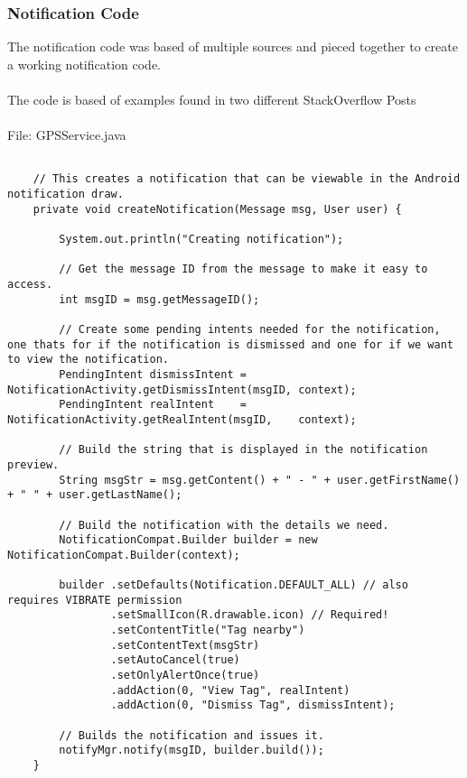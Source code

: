 \subsubsection{Notification Code}

The notification code was based of multiple sources and pieced together to create a working notification code.\\
\\
The code is based of examples found in two different StackOverflow Posts \cite{tofira:DetermineaddActionclickforAndroidnotifications:2013:online} \cite{FleshWound:HowtodismissAndroidnotificationafteractionhasbeenclicked:2012:online}\\
\\
File: GPSService.java
\begin{lstlisting}
 
    // This creates a notification that can be viewable in the Android notification draw.
    private void createNotification(Message msg, User user) {

        System.out.println("Creating notification");

        // Get the message ID from the message to make it easy to access.
        int msgID = msg.getMessageID();

        // Create some pending intents needed for the notification, one thats for if the notification is dismissed and one for if we want to view the notification.
        PendingIntent dismissIntent = NotificationActivity.getDismissIntent(msgID, context);
        PendingIntent realIntent    = NotificationActivity.getRealIntent(msgID,    context);

        // Build the string that is displayed in the notification preview.
        String msgStr = msg.getContent() + " - " + user.getFirstName() + " " + user.getLastName();

        // Build the notification with the details we need.
        NotificationCompat.Builder builder = new NotificationCompat.Builder(context);

        builder .setDefaults(Notification.DEFAULT_ALL) // also requires VIBRATE permission
                .setSmallIcon(R.drawable.icon) // Required!
                .setContentTitle("Tag nearby")
                .setContentText(msgStr)
                .setAutoCancel(true)
                .setOnlyAlertOnce(true)
                .addAction(0, "View Tag", realIntent)
                .addAction(0, "Dismiss Tag", dismissIntent);

        // Builds the notification and issues it.
        notifyMgr.notify(msgID, builder.build());
    }
\end{lstlisting}

